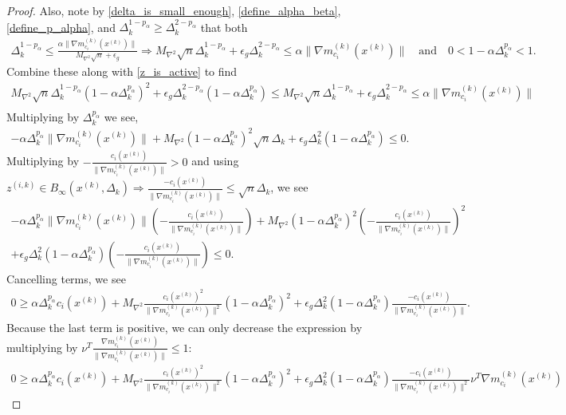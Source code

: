 \documentclass{article}
\theoremstyle{case}
\newcommand{\dk}{\Delta_k}
\newcommand{\gmcik}{{\nabla m_{c_i}^{(k)}\left(\xk\right)}}
\newcommand{\maxhessian}{{M_{\nabla^2}}}
\newcommand{\tr}{{ B_{\infty}\left(\xk, \dk\right) }}
\newcommand{\xk}{{x^{(k)}}}
\newcommand{\zik}{{z^{(i, k)}}}
\begin{document}
\begin{proof}
Also, note by \cref{delta_is_small_enough}, \cref{define_alpha_beta}, \cref{define_p_alpha}, and $\dk^{1 - p_{\alpha}} \ge \dk^{2 - p_{\alpha}}$ that both
\begin{align*}
\dk^{1-p_{\alpha}} \le \frac{\alpha \|\gmcik\|}{\maxhessian \sqrt{n} + \epsilon_g} \Longrightarrow 
\maxhessian \sqrt{n}\dk^{1- p_{\alpha}} + \epsilon_g \dk^{2 - p_{\alpha}} \le \alpha \|\gmcik\| \quad \text{and} \quad
0 < 1 - \alpha \dk^{p_{\alpha}} < 1.
\end{align*}
Combine these along with \cref{z_is_active} to find 
\begin{align*}
\maxhessian \sqrt{n}\dk^{1-p_{\alpha}}\left(1 - \alpha \dk^{p_{\alpha}}\right)^2  + \epsilon_g \dk^{2 - p_{\alpha}} \left(1 - \alpha \dk^{p_{\alpha}}\right)
\le \maxhessian \sqrt{n}\dk^{1 - p_{\alpha}} + \epsilon_g \dk^{2 - p_{\alpha}} \le \alpha \|\gmcik\| \\
\end{align*}
Multiplying by $\dk^{p_{\alpha}}$ we see,
\begin{align*}
-\alpha \dk^{p_{\alpha}}\|\gmcik\| + \maxhessian \left(1 - \alpha \dk^{p_{\alpha}}\right)^2 \sqrt{n}\dk+ \epsilon_g \dk^2 \left(1 - \alpha \dk^{p_{\alpha}}\right) \le  0.
\end{align*}
Multiplying by $-\frac{c_i(\xk)}{\|\gmcik\|} > 0$ and using $\zik \in \tr \Longrightarrow \frac{-c_i(\xk)}{\|\gmcik\|} \le \sqrt{n}\dk$, we see
\begin{align*}
-\alpha \dk^{p_{\alpha}}\|\gmcik\|\left(-\frac{c_i(\xk)}{\|\gmcik\|}\right) + \maxhessian \left(1 - \alpha \dk^{p_{\alpha}}\right)^2 \left(-\frac{c_i(\xk)}{\|\gmcik\|}\right)^2\\
+\epsilon_g \dk^2 \left(1 - \alpha \dk^{p_{\alpha}}\right)\left(-\frac{c_i(\xk)}{\|\gmcik\|}\right) \le 0.
\end{align*}
Cancelling terms, we see
\begin{align*}
0 \ge \alpha \dk^{p_{\alpha}} c_i(\xk) + \maxhessian \frac {c_i(\xk)^2}{\|\gmcik\|^2}\left(1 - \alpha \dk^{p_{\alpha}}\right)^2 + \epsilon_g \dk^2 \left(1 - \alpha \dk^{p_{\alpha}}\right)\frac{-c_i(\xk)}{\|\gmcik\|}.
\end{align*}
Because the last term is positive, we can only decrease the expression by multiplying by $\nu^T \frac{\gmcik}{\|\gmcik\|} \le 1$:
\begin{align*}
0\ge \alpha \dk^{p_{\alpha}} c_i(\xk) + \maxhessian \frac {c_i(\xk)^2}{\|\gmcik\|^2}\left(1 - \alpha \dk^{p_{\alpha}}\right)^2 + \epsilon_g \dk^2 \left(1 - \alpha \dk^{p_{\alpha}}\right)\frac{-c_i(\xk)}{\|\gmcik\|^2}\nu^T\gmcik

\end{align*}
\end{proof}
\end{document}
